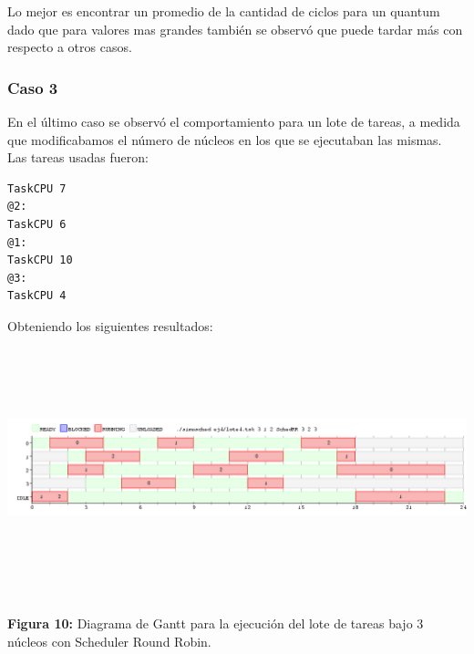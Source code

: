 \documentclass[a4paper]{article}
\begin{document}
 
  Lo mejor es encontrar un promedio de la cantidad de ciclos para un quantum dado que para valores mas grandes también se observó que puede tardar más con respecto a otros casos.   \\
 
 \bigskip
 
 \subsubsection*{Caso 3}\label{caso3}
 
 En el último caso se observó el comportamiento para un lote  de tareas, a medida que modificabamos el número de núcleos en los que se ejecutaban las mismas.\\
 
 Las tareas usadas fueron:
 \begin{codesnippet}
	\begin{verbatim}
TaskCPU 7
@2:
TaskCPU 6
@1:
TaskCPU 10
@3:
TaskCPU 4
	\end{verbatim}
	\end{codesnippet}

	
	Obteniendo los siguientes resultados:\\

  \includegraphics[width=\textwidth,height=3.0in,keepaspectratio]{imagenes/ej4/eje4.png} \\
\begin {flushleft}
\textbf{Figura 10:} Diagrama de Gantt para la ejecuci\'on del lote de tareas bajo 3 n\'ucleos con Scheduler Round Robin.
\end{flushleft}

\newpage
\end{document}
